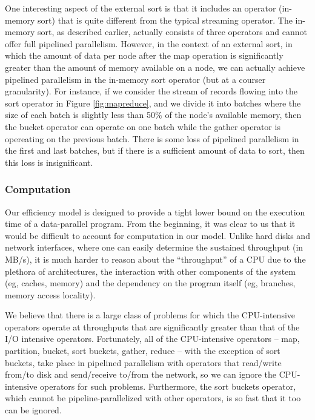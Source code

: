\documentclass{acm_proc_article-sp}
\begin{document}
One interesting aspect of the external sort is that it includes an operator
(in-memory sort) that is quite different from the typical streaming
operator. The in-memory sort, as described earlier, actually consists of three
operators and cannot offer full pipelined parallelism. However, in the context
of an external sort, in which the amount of data per node after the map
operation is significantly greater than the amount of memory available on a
node, we can actually achieve pipelined parallelism in the in-memory sort
operator (but at a courser granularity). For instance, if we consider the
stream of records flowing into the sort operator in Figure \ref{fig:mapreduce},
and we divide it into batches where the size of each batch is slightly less
than 50\% of the node's available memory, then the bucket operator can operate
on one batch while the gather operator is opereating on the previous batch.
There is some loss of pipelined parallelism in the first and last batches, but
if there is a sufficient amount of data to sort, then this loss is
insignificant.

\subsubsection{Computation}

Our efficiency model is designed to provide a tight lower bound on the
execution time of a data-parallel program. From the beginning, it was clear to
us that it would be difficult to account for computation in our model. Unlike
hard disks and network interfaces, where one can easily determine the sustained
throughput (in MB/s), it is much harder to reason about the ``throughput'' of a
CPU due to the plethora of architectures, the interaction with other components
of the system (eg, caches, memory) and the dependency on the program itself
(eg, branches, memory access locality).

We believe that there is a large class of problems for which the CPU-intensive operators operate at
throughputs that are significantly greater than that of the I/O intensive
operators. Fortunately, all of the CPU-intensive operators -- map, partition,
bucket, sort buckets, gather, reduce -- with the exception of sort buckets, take place in
pipelined parallelism with operators that read/write from/to disk and
send/receive to/from the network, so we can ignore the CPU-intensive operators
for such problems. Furthermore, the sort buckets operator,
which cannot be pipeline-parallelized with other operators, is so fast that it too can be
ignored.
\end{document}
